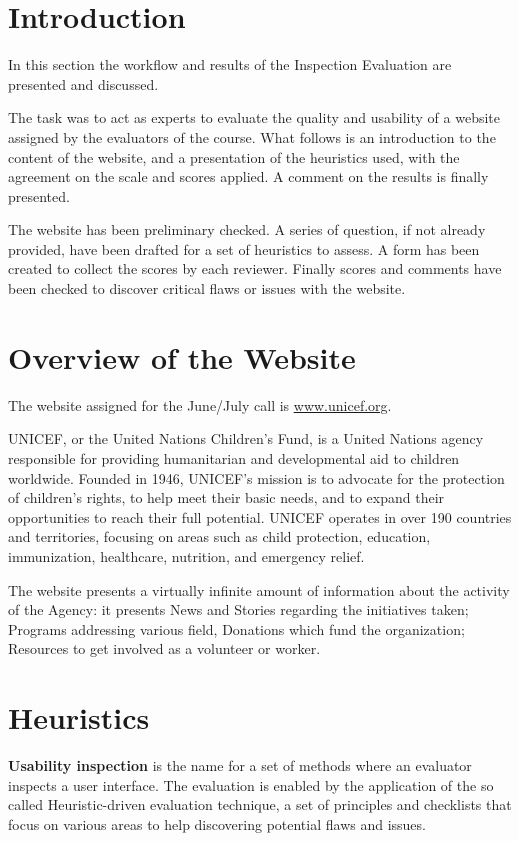 \section{Introduction}
In this section the workflow and results of the Inspection Evaluation are presented and discussed.

The task was to act as experts to evaluate the quality and usability of a website assigned by the evaluators of the course. What follows is an introduction to the content of the website, and a presentation of the heuristics used, with the agreement on the scale and scores applied. A comment on the results is finally presented.

The website has been preliminary checked. A series of question, if not already provided, have been drafted for a set of heuristics to assess. A form has been created to collect the scores by each reviewer. Finally scores and comments have been checked to discover critical flaws or issues with the website.

\section{Overview of the Website}
The website assigned for the June/July call is \underline{\url{www.unicef.org}}.

UNICEF, or the United Nations Children’s Fund, is a United Nations agency responsible for providing humanitarian and developmental aid to children worldwide. Founded in 1946, UNICEF’s mission is to advocate for the protection of children’s rights, to help meet their basic needs, and to expand their opportunities to reach their full potential. UNICEF operates in over 190 countries and territories, focusing on areas such as child protection, education, immunization, healthcare, nutrition, and emergency relief.

The website presents a virtually infinite amount of information about the activity of the Agency: it presents News and Stories regarding the initiatives taken; Programs addressing various field, Donations which fund the organization; Resources to get involved as a volunteer or worker.

\section{Heuristics}
\textbf{Usability inspection} is the name for a set of methods where an evaluator inspects a user interface.
The evaluation is enabled by the application of the so called Heuristic-driven evaluation technique, a set of principles and checklists that focus on various areas to help discovering potential flaws and issues.


